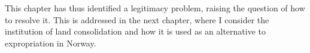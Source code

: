 This chapter has thus identified a legitimacy problem, raising the question of how to resolve it. This is addressed in the next chapter, where I consider the institution of land consolidation and how it is used as an alternative to expropriation in Norway.%